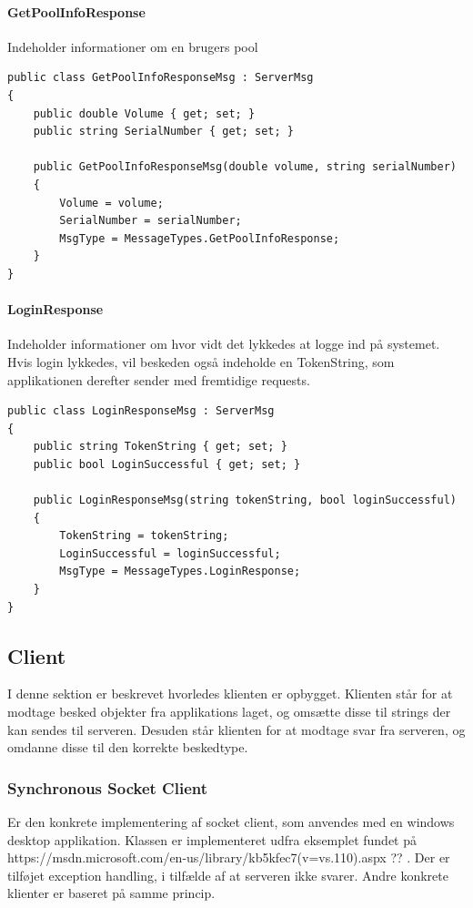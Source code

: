 \paragraph{GetPoolInfoResponse}
Indeholder informationer om en brugers pool
\begin{lstlisting}[caption=GetPoolInfoResponse, label=code:GetPoolInfoResponse]
public class GetPoolInfoResponseMsg : ServerMsg
{
	public double Volume { get; set; }
	public string SerialNumber { get; set; }
	
	public GetPoolInfoResponseMsg(double volume, string serialNumber)
	{
		Volume = volume;
		SerialNumber = serialNumber;
		MsgType = MessageTypes.GetPoolInfoResponse;
	}
}
\end{lstlisting}

\paragraph{LoginResponse}
Indeholder informationer om hvor vidt det lykkedes at logge ind på systemet. Hvis login lykkedes, vil beskeden også indeholde en TokenString, som applikationen derefter sender med fremtidige requests.
\begin{lstlisting}[caption=LoginResponse, label=code:LoginResponse]
public class LoginResponseMsg : ServerMsg
{
	public string TokenString { get; set; }
	public bool LoginSuccessful { get; set; }
	
	public LoginResponseMsg(string tokenString, bool loginSuccessful)
	{
		TokenString = tokenString;
		LoginSuccessful = loginSuccessful;
		MsgType = MessageTypes.LoginResponse;
	}
}
\end{lstlisting}

\subsection{Client}
I denne sektion er beskrevet hvorledes klienten er opbygget. Klienten står for at modtage besked objekter fra applikations laget, og omsætte disse til strings der kan sendes til serveren. Desuden står klienten for at modtage svar fra serveren, og omdanne disse til den korrekte beskedtype. 

\subsubsection{Synchronous Socket Client}
Er den konkrete implementering af socket client, som anvendes med en windows desktop applikation. Klassen er implementeret udfra eksemplet fundet på https://msdn.microsoft.com/en-us/library/kb5kfec7(v=vs.110).aspx ?? . Der er tilføjet exception handling, i tilfælde af at serveren ikke svarer. Andre konkrete klienter er baseret på samme princip.

